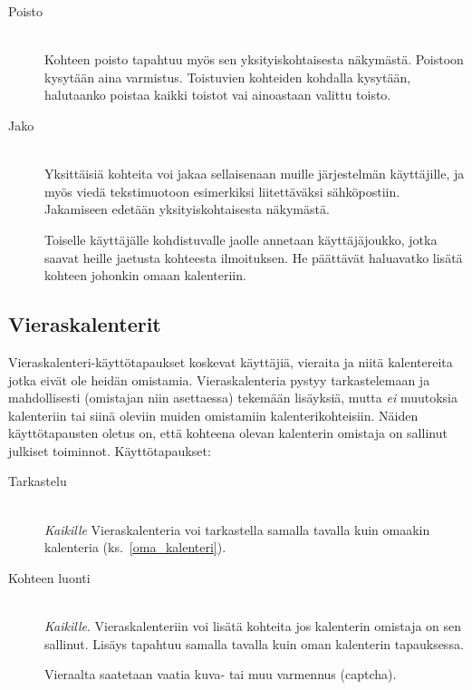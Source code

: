 \documentclass[a4paper,12pt]{report}
\begin{document}
\begin{description}
   \item[Poisto]\hfill\\
      Kohteen poisto tapahtuu myös sen yksityiskohtaisesta näkymästä.  Poistoon
      kysytään aina varmistus.  Toistuvien kohteiden kohdalla kysytään,
      halutaanko poistaa kaikki toistot vai ainoastaan valittu toisto.

   \item[Jako]\hfill\\
      Yksittäisiä kohteita voi jakaa sellaisenaan muille järjestelmän
      käyttäjille, ja myös viedä tekstimuotoon esimerkiksi liitettäväksi
      sähköpostiin.  Jakamiseen edetään yksityiskohtaisesta näkymästä. 

      Toiselle käyttäjälle kohdistuvalle jaolle annetaan käyttäjäjoukko, jotka
      saavat heille jaetusta kohteesta ilmoituksen.  He päättävät haluavatko
      lisätä kohteen johonkin omaan kalenteriin.
\end{description}

\subsection{Vieraskalenterit}
Vieraskalenteri-käyttötapaukset koskevat käyttäjiä, vieraita ja niitä
kalentereita jotka eivät ole heidän omistamia.  Vieraskalenteria pystyy
tarkastelemaan ja mahdollisesti (omistajan niin asettaessa) tekemään lisäyksiä,
mutta \emph{ei} muutoksia kalenteriin tai siinä oleviin muiden omistamiin
kalenterikohteisiin.  Näiden käyttötapausten oletus on, että kohteena olevan
kalenterin omistaja on sallinut julkiset toiminnot.  Käyttötapaukset:
\begin{description}
   \item[Tarkastelu]\hfill\\
      \textit{Kaikille} Vieraskalenteria voi tarkastella samalla tavalla kuin
      omaakin kalenteria (ks.~\ref{oma_kalenteri}).
   \item[Kohteen luonti]\hfill\\
      \textit{Kaikille}. Vieraskalenteriin voi lisätä kohteita jos kalenterin
      omistaja on sen sallinut.  Lisäys tapahtuu samalla tavalla kuin oman
      kalenterin tapauksessa. 

      Vieraalta saatetaan vaatia kuva- tai muu varmennus (captcha).
\end{description}
\end{document}
